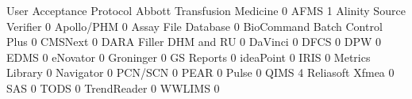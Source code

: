 \documentclass{article}
\begin{document}
\begin{Schunk}
\begin{Soutput}
                                User Acceptance Protocol
  Abbott Transfusion Medicine                          0
  AFMS                                                 1
  Alinity Source Verifier                              0
  Apollo/PHM                                           0
  Assay File Database                                  0
  BioCommand Batch Control Plus                        0
  CMSNext                                              0
  DARA Filler DHM and RU                               0
  DaVinci                                              0
  DFCS                                                 0
  DPW                                                  0
  EDMS                                                 0
  eNovator                                             0
  Groninger                                            0
  GS Reports                                           0
  ideaPoint                                            0
  IRIS                                                 0
  Metrics Library                                      0
  Navigator                                            0
  PCN/SCN                                              0
  PEAR                                                 0
  Pulse                                                0
  QIMS                                                 4
  Reliasoft Xfmea                                      0
  SAS                                                  0
  TODS                                                 0
  TrendReader                                          0
  WWLIMS                                               0
                               

\end{Soutput}
\end{Schunk}
\end{document}

